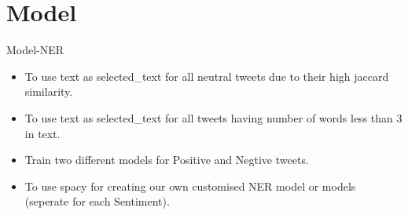 \documentclass[
 size=14pt,
 paper=smartboard,  %
 mode=present, 		%
 display=slides, 	%
 style=tuliplab,  	%
 pauseslide,
 fleqn,leqno]{powerdot}
\begin{document}
\section{Model}

\begin{slide}[toc=,bm=]{Model-NER}
\begin{itemize}
\item
To use text as selected_text for all neutral tweets due to their high jaccard similarity.
\item
To use text as selected_text for all tweets having number of words less than 3 in text.
\item
Train two different models for Positive and Negtive tweets.
\item
To use spacy for creating our own customised NER model or models (seperate for each Sentiment).
\end{itemize}
\end{slide}
\end{document}
